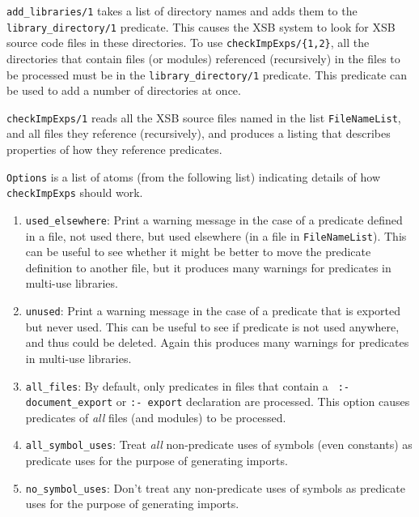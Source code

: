 \begin{description}
%
{\tt add\_libraries/1} takes a list of directory names and adds them
to the {\tt library\_directory/1} predicate.  This causes the XSB
system to look for XSB source code files in these directories.  To use
{\tt checkImpExps/\{1,2\}}, all the directories that contain files (or
modules) referenced (recursively) in the files to be processed must be
in the {\tt library\_directory/1} predicate.  This predicate can be
used to add a number of directories at once.

%
{\tt checkImpExps/1} reads all the XSB source files named in the list
{\tt FileNameList}, and all files they reference (recursively), and
produces a listing that describes properties of how they reference
predicates.

{\tt Options} is a list of atoms (from the following list) indicating
details of how {\tt checkImpExps} should work.

\begin{enumerate}
\item
   {\tt used\_elsewhere}: Print a warning message in the case of a
   predicate defined in a file, not used there, but used elsewhere (in
   a file in {\tt FileNameList}). This can be useful to see whether it
   might be better to move the predicate definition to another file,
   but it produces many warnings for predicates in multi-use
   libraries.
\item
   {\tt unused}: Print a warning message in the case of a predicate that is
   exported but never used.  This can be useful to see if predicate is
   not used anywhere, and thus could be deleted.  Again this produces
   many warnings for predicates in multi-use libraries.
\item
   {\tt all\_files}: By default, only predicates in files that contain a {\tt
   :- document\_export} or {\tt :- export} declaration are processed.
   This option causes predicates of {\em all} files (and modules) to be
   processed.
\item
   {\tt all\_symbol\_uses}: Treat {\em all} non-predicate uses of symbols
   (even constants) as predicate uses for the purpose of generating
   imports.
\item
   {\tt no\_symbol\_uses}: Don't treat any non-predicate uses of symbols as
   predicate uses for the purpose of generating imports.
\end{enumerate}


\end{description}
